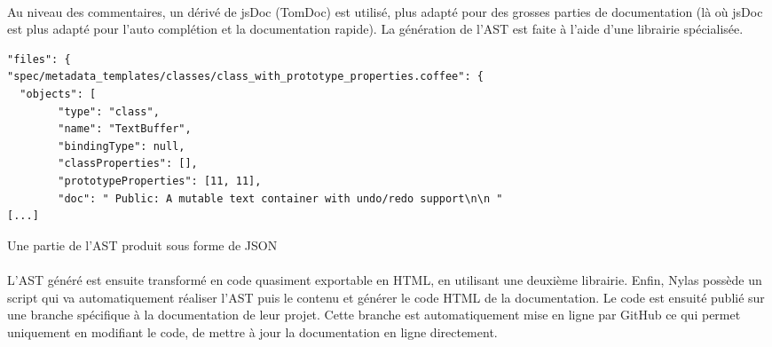         \paragraph{}
            Au niveau des commentaires, un dérivé de jsDoc (TomDoc\cite{tomdoc}) est utilisé, plus adapté
            pour des grosses parties de documentation (là où jsDoc est plus adapté pour l'auto complétion et la documentation rapide).
            La génération de l'AST est faite à l'aide d'une librairie spécialisée\cite{donna}.
        \begin{listing}[ht]
            \begin{verbatim}
"files": {
"spec/metadata_templates/classes/class_with_prototype_properties.coffee": {
  "objects": [
        "type": "class",
        "name": "TextBuffer",
        "bindingType": null,
        "classProperties": [],
        "prototypeProperties": [11, 11],
        "doc": " Public: A mutable text container with undo/redo support\n\n "
[...]
            \end{verbatim}
            \caption{Une partie de l'AST produit sous forme de JSON}
        \end{listing}

        \paragraph{}
            L'AST généré est ensuite transformé en code quasiment exportable en HTML, en utilisant une deuxième librairie\cite{tello}.
            Enfin, Nylas possède un script qui va automatiquement réaliser l'AST puis le contenu et générer le code HTML de la documentation.
            Le code est ensuité publié sur une branche spécifique à la documentation de leur projet.
            Cette branche est automatiquement mise en ligne par GitHub\cite{ghpages} ce qui permet uniquement en
            modifiant le code, de mettre à jour la documentation en ligne directement.